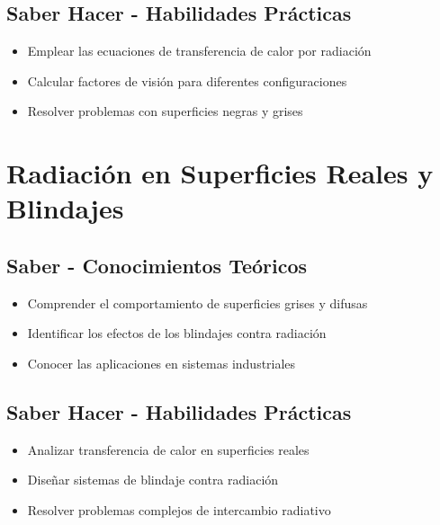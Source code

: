 \documentclass[12pt,a4paper,twoside]{book}
\begin{document}
	\subsection{Saber Hacer - Habilidades Prácticas}
	\begin{hacerbox}
		\begin{itemize}
			\item Emplear las ecuaciones de transferencia de calor por radiación
			\item Calcular factores de visión para diferentes configuraciones
			\item Resolver problemas con superficies negras y grises
		\end{itemize}
	\end{hacerbox}
	
	\section{Radiación en Superficies Reales y Blindajes}
	\label{sec:radiacion_blindajes}
	
	\subsection{Saber - Conocimientos Teóricos}
	\begin{saberbox}
		\begin{itemize}
			\item Comprender el comportamiento de superficies grises y difusas
			\item Identificar los efectos de los blindajes contra radiación
			\item Conocer las aplicaciones en sistemas industriales
		\end{itemize}
	\end{saberbox}
	
	\subsection{Saber Hacer - Habilidades Prácticas}
	\begin{hacerbox}
		\begin{itemize}
			\item Analizar transferencia de calor en superficies reales
			\item Diseñar sistemas de blindaje contra radiación
			\item Resolver problemas complejos de intercambio radiativo
		\end{itemize}
	\end{hacerbox}
	
\end{document}
